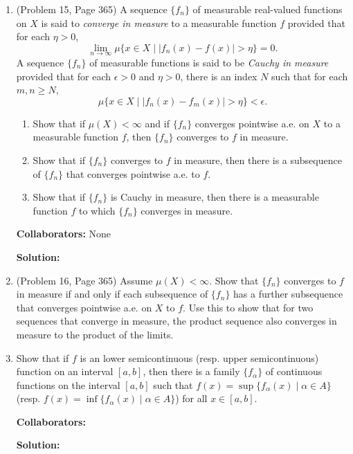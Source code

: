 \documentclass{article}%
\begin{document}
\begin{enumerate}
\item  (Problem 15, Page 365)  A sequence $\{f_n\}$ of measurable real-valued functions on $X$ is said to \emph{converge in measure} to a measurable function $f$  provided that for each $\eta > 0$, \[
\lim_{n\to \infty} \mu\{x\in X \mid |f_n(x) - f(x)|>\eta \} = 0.\]A sequence $\{f_n\}$ of measurable functions is said to be \emph{Cauchy in measure} provided that for each $\epsilon > 0$ and $\eta > 0$, there is an index $N$ such that for each $m,n\geq N$, \[
\mu\{x\in X \mid |f_n(x) - f_m(x)| > \eta \} < \epsilon.\]
\begin{enumerate}
\item Show that if $\mu(X)< \infty$ and if $\{f_n\}$ converges pointwise a.e. on $X$ to a measurable function $f$, then $\{f_n\}$ converges to $f$ in measure.
\item Show that if $\{f_n\}$ converges to $f$ in measure, then there is a subsequence of $\{f_n\}$ that converges pointwise a.e. to $f$.
\item Show that if $\{f_n\}$ is Cauchy in measure, then there is a measurable function $f$ to which $\{f_n\}$ converges in measure.
\end{enumerate}

\bigskip
\textbf{Collaborators:} None
\smallskip
 
\textbf{Solution:}

\bigskip


\item (Problem 16, Page 365) Assume $\mu (X) < \infty$.  Show that $\{f_n\}$ converges to $f$ in measure if and only if each  subsequence of $\{f_n\}$ has a further subsequence that converges pointwise a.e. on $X$ to $f$.  Use this to show that for two sequences that converge in measure, the product sequence also converges in measure to the product of the limits. 

\item Show that if $f$ is an lower semicontinuous (resp. upper semicontinuous) function on an interval $[a,b]$, then there is a family $\{f_{\alpha}\}$ of continuous functions on the interval $[a,b]$ such that $f(x) = \sup\{f_{\alpha}(x) \mid \alpha \in A \}$ (resp. $f(x) = \inf\{f_{\alpha}(x) \mid \alpha \in A \}$) for all $x \in [a,b]$.  


\bigskip
\textbf{Collaborators:}\\
\smallskip
 
\textbf{Solution:}
\bigskip






\end{enumerate}
\end{document}
